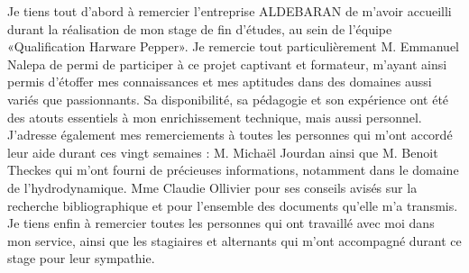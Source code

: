 Je tiens tout d’abord à remercier l’entreprise ALDEBARAN de m’avoir accueilli durant la réalisation de mon stage de fin d'études, au sein de l'équipe «Qualification Harware Pepper».
Je remercie tout particulièrement M. Emmanuel Nalepa de permi de participer à ce projet captivant et formateur, m’ayant ainsi permis d’étoffer mes connaissances et mes aptitudes dans des domaines aussi variés que passionnants. Sa disponibilité, sa pédagogie et son expérience ont été des atouts essentiels à mon enrichissement technique, mais aussi personnel.
J’adresse également mes remerciements à toutes les personnes qui m’ont accordé leur aide durant ces vingt semaines :
M. Michaël Jourdan ainsi que M. Benoit Theckes qui m’ont fourni de précieuses informations, notamment dans le domaine de l’hydrodynamique.
Mme Claudie Ollivier pour ses conseils avisés sur la recherche bibliographique et pour l’ensemble des documents qu’elle m’a transmis.
Je tiens enfin à remercier toutes les personnes qui ont travaillé avec moi dans mon service, ainsi que les stagiaires et alternants qui m’ont accompagné durant ce stage pour leur sympathie.